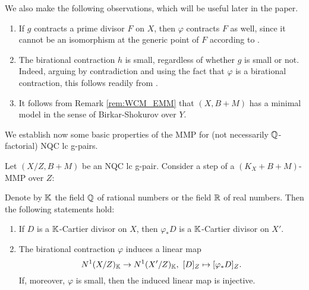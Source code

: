\begin{rem}
		We also make the following observations, which will be useful later in the paper.
		\begin{enumerate}[(1)]            
			\item If $g$ contracts a prime divisor $F$ on $X$, then $\varphi$ contracts $F$ as well, since it cannot be an isomorphism at the generic point of $F$ according to \cite[Lemma 2.8(ii)(a)]{LMT}.
			
			\item The birational contraction $h$ is small, regardless of whether $g$ is small or not. Indeed, arguing by contradiction and using the fact that $\varphi$ is a birational contraction, this follows readily from \cite[Lemma 2.8(ii)(b)]{LMT}.
			
			\item It follows from Remark \ref{rem:WCM_EMM} that $ (X,B+M) $ has a minimal model in the sense of Birkar-Shokurov over $ Y $.
		\end{enumerate}
	\end{rem}
	
	We establish now some basic properties of the MMP for (not necessarily $\mathbb{Q}$-factorial) NQC lc g-pairs.
	
	\begin{lem}\label{lem:properties_of_MMP}
		Let $(X/Z,B+M)$ be an NQC lc g-pair. Consider a step of a $(K_X+B+M)$-MMP over $ Z $:
		\begin{center}
		\end{center}
		Denote by $\mathbb{K}$ the field $\mathbb{Q}$ of rational numbers or the field $\mathbb{R}$ of real numbers. Then the following statements hold:
		
		\begin{enumerate}[\normalfont (i)]
			\item If $D$ is a $\mathbb{K}$-Cartier divisor on $X$, then $\varphi_*D$ is a $\mathbb{K}$-Cartier divisor on $X'$.
			
			\item The birational contraction $\varphi$ induces a linear map 
			\[ N^1(X/Z)_{\mathbb{K}} \to N^1(X'/Z)_{\mathbb{K}} , \ [D]_Z \mapsto [\varphi_* D]_Z . \]
			If, moreover, $\varphi$ is small, then the induced linear map is injective.
		\end{enumerate}
	\end{lem}
	
